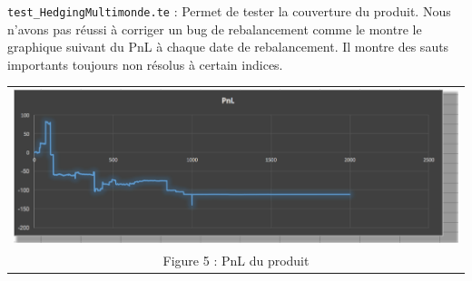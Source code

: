 \documentclass[a4paper,12pt]{article}
\begin{document}
{\tt test\_HedgingMultimonde.te} : Permet de tester la couverture du produit. Nous n'avons pas réussi à corriger un bug de rebalancement comme le montre le graphique suivant du PnL à chaque date de rebalancement. Il montre des sauts importants toujours non résolus à certain indices.
\begin{center}
\begin{tabular}{c}
\includegraphics[scale=0.6]{pnl} \\
Figure 5 : PnL du produit
\end{tabular}
\end{center}
 
\end{document}
